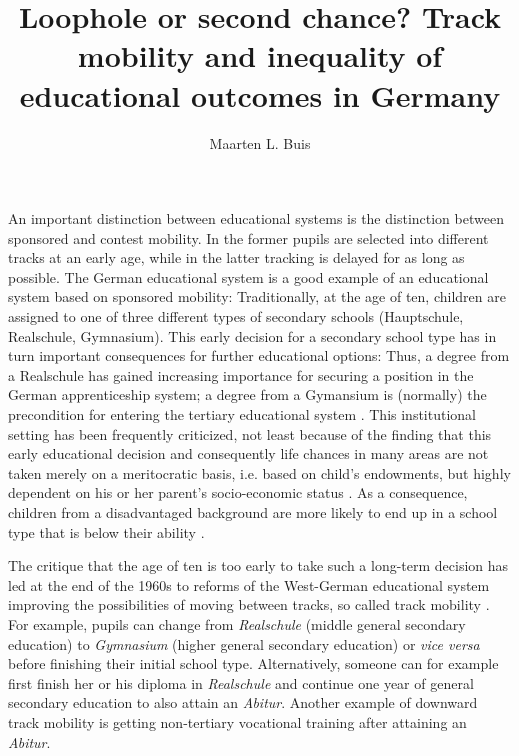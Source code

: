 \documentclass[a4,11pt]{article}
\author{Maarten L. Buis}
\title{Loophole or second chance? Track mobility and inequality of educational outcomes in Germany}
\begin{document}
\maketitle

An important distinction between educational systems is the distinction between sponsored and contest mobility. \citep{turner60} In the former pupils are selected into different tracks at an early age, while in the latter tracking is delayed for as long as possible. The German educational system is a good example of an educational system based on sponsored mobility: Traditionally, at the age of ten, children are assigned to one of three different types of secondary schools (Hauptschule, Realschule, Gymnasium). This early decision for a secondary school type has in turn important consequences for further educational options: Thus, a degree from a Realschule has gained increasing importance for securing a position in the German apprenticeship system; a degree from a Gymansium is (normally) the precondition for entering the tertiary educational system \citep{cortina_etal_08}. This institutional setting has been frequently criticized, not least because of the finding that this early educational decision and consequently life chances in many areas are not taken merely on a meritocratic basis, i.e. based on child’s endowments, but highly dependent on his or her parent’s socio-economic status \citep{breen_jonsson00,jacob_tieben09}. As a consequence, children from a disadvantaged background are more likely to end up in a school type that is below their ability \citep{Uhlig_etal09}.

The critique that the age of ten is too early to take such a long-term decision has led at the end of the 1960s to reforms of the West-German educational system improving the possibilities of moving between tracks, so called track mobility \citep{cortina_etal_08,jacob_tieben09}. For example, pupils can change from \emph{Realschule} (middle general secondary education) to \emph{Gymnasium} (higher general secondary education) or \emph{vice versa} before finishing their initial school type. Alternatively, someone can for example first finish her or his diploma in \emph{Realschule} and continue one year of general secondary education to also attain an \emph{Abitur}. Another example of downward track mobility is getting non-tertiary vocational training after attaining an \emph{Abitur}. 
\end{document}
